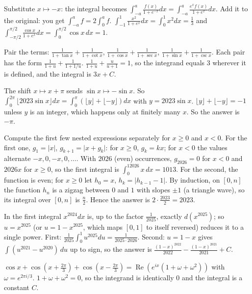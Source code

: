 \documentclass[11pt,a4paper]{article}
\begin{document}

Substitute \(x\mapsto -x\): the integral becomes \(\int_{-a}^a\frac{f(x)}{1+e^{-x}}dx=\int_{-a}^a\frac{e^xf(x)}{1+e^x}dx\). Add it to the original: you get \(\int_{-a}^af=2\int_0^af\).
\(\int_{-1}^1\frac{x^2}{1+e^x}dx=\int_0^1x^2dx=\frac13\) and \(\int_{-\pi/2}^{\pi/2}\frac{\cos x}{1+e^x}dx=\int_0^{\pi/2}\cos x\,dx=1\).

Pair the terms: \(\frac1{1+\tan x}+\frac1{1+\cot x}\), \(\frac1{1+\cos x}+\frac1{1+\sec x}\), \(\frac1{1+\sin x}+\frac1{1+\csc x}\). Each pair has the form \(\frac1{1+u}+\frac1{1+1/u}\).
\(\frac1{1+u}+\frac{u}{u+1}=1\), so the integrand equals \(3\) wherever it is defined, and the integral is \(3x+C\).

The shift \(x\mapsto x+\pi\) sends \(\sin x\mapsto-\sin x\). So \(\int_0^{2\pi}\lfloor 2023\sin x\rfloor dx=\int_0^\pi\left(\lfloor y\rfloor+\lfloor -y\rfloor\right)dx\) with \(y=2023\sin x\).
\(\lfloor y\rfloor+\lfloor -y\rfloor=-1\) unless \(y\) is an integer, which happens only at finitely many \(x\). So the answer is \(-\pi\).

Compute the first few nested expressions separately for \(x\ge0\) and \(x\lt0\). For the first one, \(g_1=\lvert x\rvert\), \(g_{k+1}=\lvert x+g_k\rvert\): for \(x\ge0\), \(g_k=kx\); for \(x\lt0\) the values alternate \(-x,0,-x,0,\dots\).
With \(2026\) (even) occurrences, \(g_{2026}=0\) for \(x\lt0\) and \(2026x\) for \(x\ge0\), so the first integral is \(\int_0^12026x\,dx=1013\).
For the second, the function is even; for \(x\ge0\) let \(h_0=x\), \(h_k=\lvert h_{k-1}-1\rvert\). By induction, on \([0,n]\) the function \(h_n\) is a zigzag between \(0\) and \(1\) with slopes \(\pm1\) (a triangle wave), so its integral over \([0,n]\) is \(\frac n2\). Hence the answer is \(2\cdot\frac{2023}2=2023\).

In the first integral \(x^{2024}dx\) is, up to the factor \(\frac1{2025}\), exactly \(d(x^{2025})\); so \(u=x^{2025}\) (or \(u=1-x^{2025}\), which maps \([0,1]\) to itself reversed) reduces it to a single power.
First: \(\frac1{2025}\int_0^1u^{2025}du=\frac1{2025\cdot2026}\). Second: \(u=1-x\) gives \(\int(u^{2021}-u^{2020})\,du\) up to sign, so the answer is \(\frac{(1-x)^{2022}}{2022}-\frac{(1-x)^{2021}}{2021}+C\).

\(\cos x+\cos(x+\frac{2\pi}3)+\cos(x-\frac{2\pi}3)=\operatorname{Re}\left(e^{ix}(1+\omega+\omega^2)\right)\) with \(\omega=e^{2\pi i/3}\).
\(1+\omega+\omega^2=0\), so the integrand is identically \(0\) and the integral is a constant \(C\).
\end{document}
